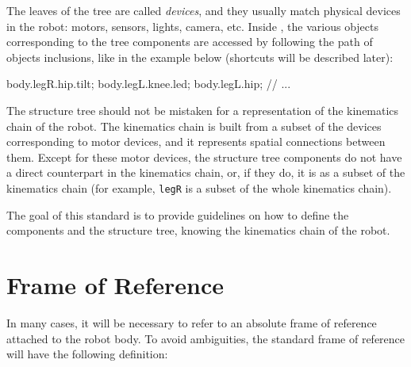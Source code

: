 The leaves of the tree are called \textit{devices}, and they usually
match physical devices in the robot: motors, sensors, lights, camera,
etc. Inside \urbi, the various objects corresponding to the tree
components are accessed by following the path of objects inclusions,
like in the example below (shortcuts will be described later):

\begin{urbifixme}
body.legR.hip.tilt;
body.legL.knee.led;
body.legL.hip;
// ...
\end{urbifixme}


The structure tree should not be mistaken for a representation of the
kinematics chain of the robot. The kinematics chain is built from a
subset of the devices corresponding to motor devices, and it
represents spatial connections between them. Except for these motor
devices, the structure tree components do not have a direct
counterpart in the kinematics chain, or, if they do, it is as a subset
of the kinematics chain (for example, \texttt{legR} is a subset of the
whole kinematics chain).


The goal of this standard is to provide guidelines on how to define
the components and the structure tree, knowing the kinematics chain of
the robot.

\section{Frame of Reference}

In many cases, it will be necessary to refer to an absolute frame of
reference attached to the robot body. To avoid ambiguities, the
standard frame of reference will have the following definition:

